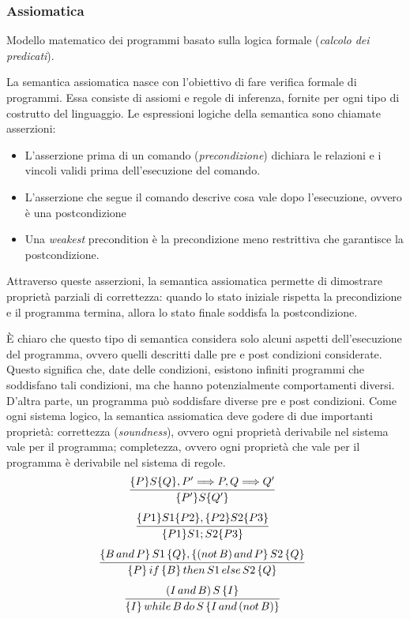 \documentclass[oneside,a4paper,11pt]{book}
\theoremstyle{italicstyle}
\theoremstyle{normStyle}
\begin{document}
\subsubsection{Assiomatica}
\begin{tcolorbox}[title={Semantica assiomatica}]
  Modello matematico dei programmi basato sulla
  logica formale (\textit{calcolo dei predicati}).
\end{tcolorbox}
La semantica assiomatica nasce con l’obiettivo di fare verifica formale di programmi.
Essa consiste di assiomi e regole di inferenza, fornite per ogni tipo di costrutto del
linguaggio. Le espressioni logiche della semantica sono chiamate asserzioni:
\begin{itemize}
  \item L'asserzione prima di un comando (\textit{precondizione}) dichiara le relazioni
  e i vincoli validi prima dell’esecuzione del comando.
  \item L’asserzione che segue il comando descrive cosa vale dopo l’esecuzione,
  ovvero è una postcondizione
  \item Una \textit{weakest} precondition è la precondizione meno restrittiva che garantisce
  la postcondizione. 
\end{itemize}
Attraverso queste asserzioni, la semantica assiomatica permette di dimostrare proprietà
parziali di correttezza: quando lo stato iniziale rispetta la precondizione e il 
programma termina, allora lo stato finale soddisfa la postcondizione.

È chiaro che questo tipo di semantica considera solo alcuni aspetti dell’esecuzione
del programma, ovvero quelli descritti dalle pre e post condizioni considerate.
Questo significa che, date delle condizioni, esistono infiniti programmi che
soddisfano tali condizioni, ma che hanno potenzialmente comportamenti diversi.
D’altra parte, un programma può soddisfare diverse pre e post condizioni.
Come ogni sistema logico, la semantica assiomatica deve godere di due importanti
proprietà: correttezza (\textit{soundness}), ovvero ogni proprietà derivabile nel sistema
vale per il programma;  completezza, ovvero ogni proprietà che vale per il programma
è derivabile nel sistema di regole.
\[
  \infer[\scriptscriptstyle]
  {
    \{P'\}S\{Q'\}
  }
  {
    \{P\}S\{Q\}, P' \Longrightarrow P, Q\Longrightarrow Q'
  }
\]
\[
  \infer[\scriptscriptstyle]
  {
    \{P1\}S1;S2\{P3\}
  }
  {
    \{P1\}S1\{P2\}, \{P2\}S2\{P3\}
  }
\]
\[
  \infer[\scriptscriptstyle]
  {
    \{P\}\,if\,\{B\}\,then\,S1\,else\,S2\,\{Q\}
  }
  {
    \{B\,and\,P\}\,S1\,\{Q\}, \{(not\,B)\,and\,P\}\,S2\,\{Q\}
  }
\]
\[
  \infer[\scriptscriptstyle]
  {
    \{I\}\,while\,B\,do\,S\,\{I\,and\,(not\,B)\}
  }
  {
    (I\,and\,B)\,S\,\{I\}
  }
\]
\end{document}
